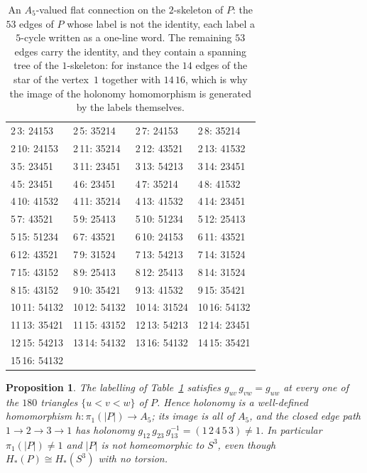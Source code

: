\documentclass[11pt]{amsart}
\newtheorem{proposition}[theorem]{Proposition}
\theoremstyle{definition}
\theoremstyle{remark}
\begin{document}
\begin{table}[htbp]
\small
\setlength{\tabcolsep}{9pt}
\begin{tabular}{llll}
\hline
2\,3: 24153 & 2\,5: 35214 & 2\,7: 24153 & 2\,8: 35214 \\
2\,10: 24153 & 2\,11: 35214 & 2\,12: 43521 & 2\,13: 41532 \\
3\,5: 23451 & 3\,11: 23451 & 3\,13: 54213 & 3\,14: 23451 \\
4\,5: 23451 & 4\,6: 23451 & 4\,7: 35214 & 4\,8: 41532 \\
4\,10: 41532 & 4\,11: 35214 & 4\,13: 41532 & 4\,14: 23451 \\
5\,7: 43521 & 5\,9: 25413 & 5\,10: 51234 & 5\,12: 25413 \\
5\,15: 51234 & 6\,7: 43521 & 6\,10: 24153 & 6\,11: 43521 \\
6\,12: 43521 & 7\,9: 31524 & 7\,13: 54213 & 7\,14: 31524 \\
7\,15: 43152 & 8\,9: 25413 & 8\,12: 25413 & 8\,14: 31524 \\
8\,15: 43152 & 9\,10: 35421 & 9\,13: 41532 & 9\,15: 35421 \\
10\,11: 54132 & 10\,12: 54132 & 10\,14: 31524 & 10\,16: 54132 \\
11\,13: 35421 & 11\,15: 43152 & 12\,13: 54213 & 12\,14: 23451 \\
12\,15: 54213 & 13\,14: 54132 & 13\,16: 54132 & 14\,15: 35421 \\
15\,16: 54132 & & & \\
\hline
\end{tabular}
\medskip
\caption{An $A_5$-valued flat connection on the $2$-skeleton of $P$: the $53$ edges of
$P$ whose label is not the identity, each label a $5$-cycle written as a one-line word.
The remaining $53$ edges carry the identity, and they contain a spanning tree of the
$1$-skeleton: for instance the $14$ edges of the star of the vertex~$1$ together with
$14\,16$, which is why the image of the holonomy homomorphism is generated by the labels
themselves.}
\label{tab:labels}
\end{table}

\begin{proposition}\label{prop:pi1}
The labelling of Table~\ref{tab:labels} satisfies
$g_{uv}\,g_{vw}=g_{uw}$ at every one of the $180$ triangles $\{u<v<w\}$ of $P$. Hence
holonomy is a well-defined homomorphism $h\colon\pi_1(|P|)\to A_5$; its image is all of
$A_5$, and the closed edge path $1\to2\to3\to1$ has holonomy
$g_{12}\,g_{23}\,g_{13}^{-1}=(1\,2\,4\,5\,3)\ne1$. In particular $\pi_1(|P|)\ne1$ and
$|P|$ is not homeomorphic to $S^3$, even though $H_*(P)\cong H_*(S^3)$ with no torsion.
\end{proposition}
\end{document}
